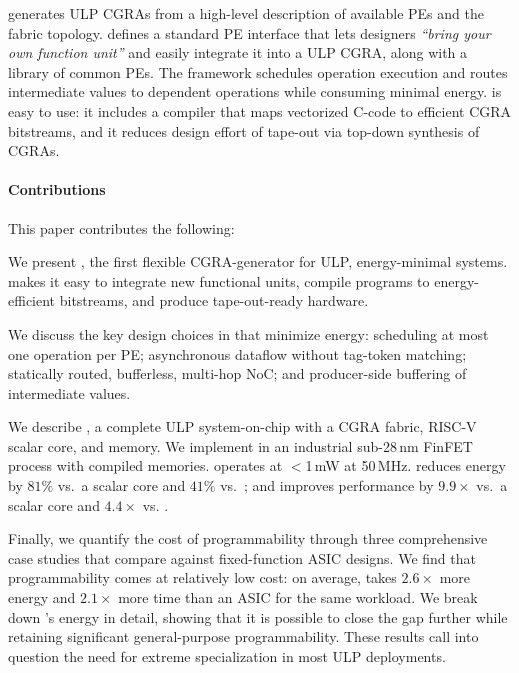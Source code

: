 \snafuframe generates ULP CGRAs from a high-level description of available PEs and the fabric topology.
%
\snafuframe defines a standard PE interface that lets designers \emph{``bring your own function unit''}
and easily integrate it into a ULP CGRA,
along with a library of common PEs.
%
The \snafuframe framework schedules operation execution and routes intermediate values to dependent operations
while consuming minimal energy.
%
\snafuframe is easy to use:
it includes a compiler that maps vectorized C-code to efficient CGRA bitstreams,
and it reduces design effort of tape-out via top-down synthesis of CGRAs.

\figSNAFUIntro

\paragraph{Contributions} This paper contributes the following:
\begin{compactitem}
\item We present \snafuframe, the first flexible CGRA-generator for ULP, energy-minimal systems.
  \snafuframe makes it easy to integrate new functional units,
  compile programs to energy-efficient bitstreams,
  and produce tape-out-ready hardware.
  
\item We discuss the key design choices in \snafuframe that minimize energy:
  scheduling at most one operation per PE;
  asynchronous dataflow without tag-token matching;
  statically routed, bufferless, multi-hop NoC;
  and producer-side buffering of intermediate values.
  
\item We describe \snafuarch, a complete ULP system-on-chip with a CGRA fabric,
  RISC-V scalar core, and memory.
  We implement \snafuarch in an industrial sub-28\,nm FinFET process with compiled memories.
  \snafuarch operates at $<$1\,mW at 50\,MHz.
  \snafuarch reduces energy by $81\%$ vs.\ a scalar core
  and $41\%$ vs.\ \manic;
  and improves performance by $9.9\times$ vs.\ a scalar core
  and $4.4\times$ vs. \manic.

\item Finally, we quantify the cost of programmability through three
  comprehensive case studies that compare \snafuarch against
  fixed-function ASIC designs. We find that programmability comes at
  relatively low cost: on average, \snafuarch takes $2.6\times$ more
  energy and $2.1\times$ more time than an ASIC for the same
  workload. We break down \snafuarch's energy in detail, showing that it
  is possible to close the gap further while retaining significant
  general-purpose programmability. These results call into
  question the need for extreme specialization in most ULP
  deployments.
  
\end{compactitem}

